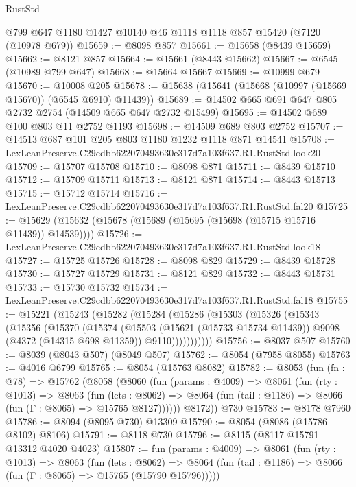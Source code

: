 \begin{lexlean}{RustStd}
\begin{coremodule}
    @799
    @647
    @1180
    @1427
    @10140
    @46
    @1118
    @1118
    @857
    @15420
    (@7120 (@10978 @679))
@15659 := @8098 @857
@15661 := @15658 (@8439 @15659)
@15662 := @8121 @857
@15664 := @15661 (@8443 @15662)
@15667 := @6545 (@10989 @799 @647)
@15668 := @15664 @15667
@15669 := @10999 @679
@15670 := @10008 @205
@15678 := @15638 (@15641 (@15668 (@10997 (@15669 @15670)) (@6545 @6910) @11439))
@15689 := @14502 @665 @691 @647 @805 @2732 @2754 (@14509 @665 @647 @2732 @15499)
@15695 := @14502 @689 @100 @803 @11 @2752 @1193
@15698 := @14509 @689 @803 @2752
@15707 := @14513 @687 @101 @205 @803 @1180 @1232 @1118 @871 @14541
@15708 := LexLeanPreserve.C29cdbb622070493630e317d7a103f637.R1.RustStd.look20
@15709 := @15707 @15708
@15710 := @8098 @871
@15711 := @8439 @15710
@15712 := @15709 @15711
@15713 := @8121 @871
@15714 := @8443 @15713
@15715 := @15712 @15714
@15716 := LexLeanPreserve.C29cdbb622070493630e317d7a103f637.R1.RustStd.fal20
@15725 := @15629 (@15632 (@15678 (@15689 (@15695 (@15698 (@15715 @15716 @11439)) @14539))))
@15726 := LexLeanPreserve.C29cdbb622070493630e317d7a103f637.R1.RustStd.look18
@15727 := @15725 @15726
@15728 := @8098 @829
@15729 := @8439 @15728
@15730 := @15727 @15729
@15731 := @8121 @829
@15732 := @8443 @15731
@15733 := @15730 @15732
@15734 := LexLeanPreserve.C29cdbb622070493630e317d7a103f637.R1.RustStd.fal18
@15755 := @15221
    (@15243
      (@15282
        (@15284
          (@15286
            (@15303
              (@15326
                (@15343
                  (@15356
                    (@15370
                      (@15374
                        (@15503
                          (@15621 (@15733 @15734 @11439))
                          @9098
                          (@4372 (@14315 @698 @11359))
                          @9110)))))))))))
@15756 := @8037 @507
@15760 := @8039 (@8043 @507) (@8049 @507)
@15762 := @8054 (@7958 @8055)
@15763 := @4016 @6799
@15765 := @8054 (@15763 @8082)
@15782 := @8053
    (fun (fn : @78) =>
    @15762
      (@8058
        (@8060
          (fun (params : @4009) =>
          @8061
            (fun (rty : @1013) =>
            @8063
              (fun (lets : @8062) =>
              @8064 (fun (tail : @1186) => @8066 (fun (Γ : @8065) => @15765 @8127))))))
        @8172))
    @730
@15783 := @8178 @7960
@15786 := @8094 (@8095 @730) @13309
@15790 := @8054 (@8086 (@15786 @8102) @8106)
@15791 := @8118 @730
@15796 := @8115 (@8117 @15791 @13312 @4020 @4023)
@15807 := fun (params : @4009) =>
  @8061
    (fun (rty : @1013) =>
    @8063
      (fun (lets : @8062) =>
      @8064 (fun (tail : @1186) => @8066 (fun (Γ : @8065) => @15765 (@15790 @15796)))))

\end{coremodule}
\end{lexlean}
